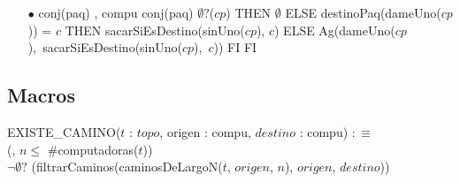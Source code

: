 \begin{itemize}
\item[$\bullet$] {conj(paq) , compu} {conj(paq)} {}
 {\IF $\emptyset?$($cp$)
											 THEN $\emptyset$
											 ELSE {\IF destinoPaq(dameUno($cp$)) = $c$
											 		THEN sacarSiEsDestino(sinUno($cp$), $c$)
											 		ELSE \mbox{Ag(dameUno($cp$), sacarSiEsDestino(sinUno($cp$), $c$))}
											 		FI}
											 FI}
\end{itemize}

\subsection*{Macros}
EXISTE\_CAMINO($t$ : $topo$, origen : compu, $destino$ : compu) $:\equiv$ \\
\hspace*{6em}(, $n \leq$ \#computadoras($t$))\\
\hspace*{8em}$\neg\emptyset?$ (filtrarCaminos(caminosDeLargoN($t$, $origen$, $n$), $origen$, $destino$))

